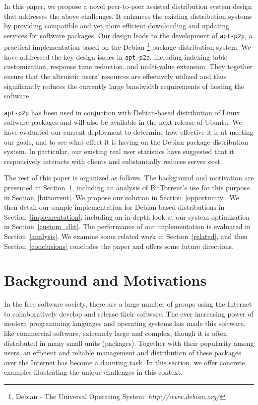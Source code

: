 \documentclass[conference]{IEEEtran}
\begin{document}
In this paper, we propose a novel peer-to-peer assisted distribution system design that
addresses the above challenges. It enhances the existing distribution systems by providing compatible and yet more efficient downloading and updating services
for software packages. Our design leads to the development of \texttt{apt-p2p}, a practical implementation based on the Debian \footnote{Debian - The Universal Operating System: {\it http://www.debian.org/}} package
distribution system.  We have addressed the key design issues in \texttt{apt-p2p}, including indexing table customization,
response time reduction, and multi-value extension. They together ensure
that the altruistic users' resources are effectively utilized and thus significantly reduces the currently
large bandwidth requirements of hosting the software.

\texttt{apt-p2p}  has been used in conjuction with Debian-based distribution of Linux
software packages and will also be available in the next release of Ubuntu. We have evaluated our current deployment  to
determine how effective it is at meeting our goals, and to see what
effect it is having on the Debian package distribution system. In particular, our existing real user statistics
have suggested that it responsively interacts with clients and substantially reduces server cost.

The rest of this paper is organized as follows. The background and motivation are presented in Section~\ref{situation}, including an analysis of BitTorrent's use for this purpose in Section~\ref{bittorrent}. We propose
our solution in Section~\ref{opportunity}. We then detail our sample
implementation for Debian-based distributions in Section~\ref{implementation},
including an in-depth look at our system optimization
in Section~\ref{custom_dht}. The performance of our implementation is evaluated
in Section~\ref{analysis}. We examine some related work in Section~\ref{related}, and then
Section~\ref{conclusions} concludes the paper and offers some future directions.


\section{Background and Motivations}
\label{situation}

In the free software society, there are a large number of groups using the Internet to
collaboratively develop and release their software. The ever increasing power of
modern programming languages and operating systems has made this software, like commercial software, extremely large and complex, though it is often
distributed in many small units (packages). Together with their popularity among users,
an efficient and reliable management and distribution of these packages over the Internet has become a daunting task. In this section, we offer concrete examples illustrating the
unique challenges in this context.
\end{document}

